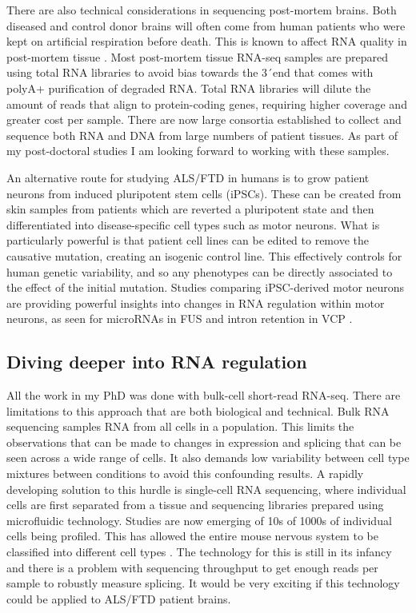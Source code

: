 There are also technical considerations in sequencing post-mortem brains.
Both diseased and control donor brains will often come from human patients who were kept on artificial respiration before death. 
This is known to affect RNA quality in post-mortem tissue \citep{Durrenberger2010}.
Most post-mortem tissue RNA-seq samples are prepared using total RNA libraries to avoid bias towards the 3\'\ end that comes with polyA+ purification of degraded RNA.
Total RNA libraries will dilute the amount of reads that align to protein-coding genes, requiring higher coverage and greater cost per sample.
There are now large consortia established to collect and sequence both RNA and DNA from large numbers of patient tissues. 
As part of my post-doctoral studies I am looking forward to working with these samples.

An alternative route for studying ALS/FTD in humans is to grow patient neurons from induced pluripotent stem cells (iPSCs).
These can be created from skin samples from patients which are reverted a pluripotent state and then differentiated into disease-specific cell types such as motor neurons.
What is particularly powerful is that patient cell lines can be edited to remove the causative mutation, creating an isogenic control line.
This effectively controls for human genetic variability, and so any phenotypes can be directly associated to the effect of the initial mutation.
Studies comparing iPSC-derived motor neurons are providing powerful insights into changes in RNA regulation within motor neurons, as seen for microRNAs in FUS \citep{DeSantis2017} and intron retention in VCP \citep{Luisier2018}. 

\subsection{Diving deeper into RNA regulation}

All the work in my PhD was done with bulk-cell short-read RNA-seq. 
There are limitations to this approach that are both biological and technical.
Bulk RNA sequencing samples RNA from all cells in a population. 
This limits the observations that can be made to changes in expression and splicing that can be seen across a wide range of cells.
It also demands low variability between cell type mixtures between conditions to avoid this confounding results.
A rapidly developing solution to this hurdle is single-cell RNA sequencing, where individual cells are first separated from a tissue and sequencing libraries prepared using microfluidic technology.
Studies are now emerging of 10s of 1000s of individual cells being profiled. 
This has allowed the entire mouse nervous system to be classified into different cell types \citep{Zeisel2018}. 
The technology for this is still in its infancy and there is a problem with sequencing throughput to get enough reads per sample to robustly measure splicing.
It would be very exciting if this technology could be applied to ALS/FTD patient brains. 

